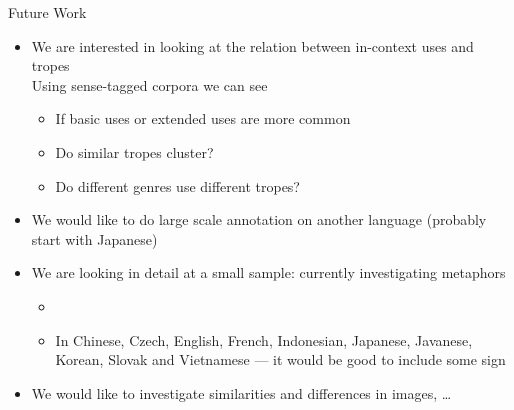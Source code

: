\documentclass[dvipsnames]{beamer}
\newcommand{\rel}[1]{\textsc{\color{blue}{#1}}}
\newcommand{\lnk}[1]{\rel{#1}}
\begin{document}
\begin{frame}{Future Work}

  \begin{itemize}
  \item We are interested in looking at
    the relation between in-context uses
    and tropes
  \\  Using sense-tagged corpora we can see 
    \begin{itemize}
    \item If basic uses or extended uses are more common
    \item Do similar tropes cluster?
    \item Do different genres use different tropes?
    \end{itemize}
  \item We would like to do large scale
    annotation on another language
    (probably start with Japanese)
  \item We are looking in detail at a small sample: currently investigating
    \lnk{animal:person} metaphors
    \begin{itemize}
    \item  {}
    \item In Chinese, Czech, English, French,
      Indonesian, Japanese, Javanese,
      Korean, Slovak and Vietnamese  --- it would be good to include some sign
    \end{itemize}
  \item We would like to investigate similarities and differences in images, \ldots
  \end{itemize}
\end{frame}
\end{document}
